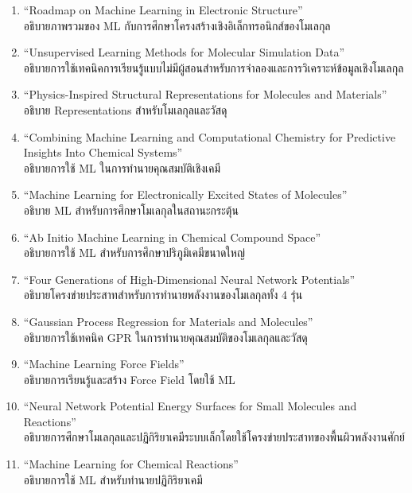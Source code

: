 \begin{enumerate}
    \item \enquote{Roadmap on Machine Learning in Electronic Structure}\autocite{kulik2022}\\
    อธิบายภาพรวมของ ML กับการศึกษาโครงสร้างเชิงอิเล็กทรอนิกส์ของโมเลกุล
    
    \item \enquote{Unsupervised Learning Methods for Molecular Simulation Data}\autocite{glielmo2021}\\
    อธิบายการใช้เทคนิคการเรียนรู้แบบไม่มีผู้สอนสำหรับการจำลองและการวิเคราะห์ข้อมูลเชิงโมเลกุล

    \item \enquote{Physics-Inspired Structural Representations for Molecules and Materials}\autocite{musil2021}\\
    อธิบาย Representations สำหรับโมเลกุลและวัสดุ

    \item \enquote{Combining Machine Learning and Computational Chemistry for Predictive Insights Into Chemical 
    Systems}\autocite{keith2021}\\
    อธิบายการใช้ ML ในการทำนายคุณสมบัติเชิงเคมี

    \item \enquote{Machine Learning for Electronically Excited States of Molecules}\autocite{westermayr2021a}\\
    อธิบาย ML สำหรับการศึกษาโมเลกุลในสถานะกระตุ้น

    \item \enquote{Ab Initio Machine Learning in Chemical Compound Space}\autocite{huang2021}\\
    อธิบายการใช้ ML สำหรับการศึกษาปริภูมิเคมีขนาดใหญ่

    \item \enquote{Four Generations of High-Dimensional Neural Network Potentials}\autocite{behler2021}\\
    อธิบายโครงข่ายประสาทสำหรับการทำนายพลังงานของโมเลกุลทั้ง 4 รุ่น

    \item \enquote{Gaussian Process Regression for Materials and Molecules}\autocite{deringer2021}\\
    อธิบายการใช้เทคนิค GPR ในการทำนายคุณสมบัติของโมเลกุลและวัสดุ

    \item \enquote{Machine Learning Force Fields}\autocite{unke2021}\\
    อธิบายการเรียนรู้และสร้าง Force Field โดยใช้ ML

    \item \enquote{Neural Network Potential Energy Surfaces for Small Molecules and Reactions}\autocite{manzhos2021}\\
    อธิบายการศึกษาโมเลกุลและปฏิกิริยาเคมีระบบเล็กโดยใช้โครงข่ายประสาทของพื้นผิวพลังงานศักย์

    \item \enquote{Machine Learning for Chemical Reactions}\autocite{meuwly2021}\\
    อธิบายการใช้ ML สำหรับทำนายปฏิกิริยาเคมี
\end{enumerate}
